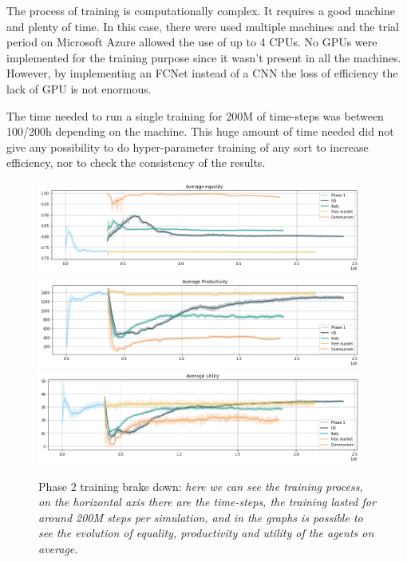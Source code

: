 The process of training is computationally complex. It requires a good machine and plenty of time. In this case, there were used multiple machines and the trial period on Microsoft Azure allowed the use of up to 4 CPUs. No GPUs were implemented for the training purpose since it wasn't present in all the machines. However, by implementing an FCNet instead of a CNN the loss of efficiency the lack of GPU is not enormous.

The time needed to run a single training for 200M of time-steps was between 100/200h depending on the machine. This huge amount of time needed did not give any possibility to do hyper-parameter training of any sort to increase efficiency, nor to check the consistency of the results.

\begin{figure}[h!]
    \centering
    \linespread{.9}
    \includegraphics[width=0.95\textwidth]{Resources/imgs/equality_training.png}
    \includegraphics[width=0.95\textwidth]{Resources/imgs/productivity_training.png}
    \includegraphics[width=0.95\textwidth]{Resources/imgs/utility_training.png}
    \caption[Phase 2 training brake down: ]%
    {\label{img:p1_brakedown}Phase 2 training brake down: \small \textit{here we can see the training process, on the horizontal axis there are the time-steps, the training lasted for around 200M steps per simulation, and in the graphs is possible to see the evolution of equality, productivity and utility of the agents on average.}}
\end{figure}


